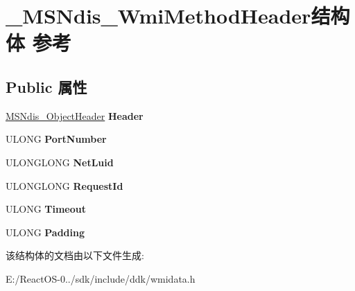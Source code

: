 \hypertarget{struct___m_s_ndis___wmi_method_header}{}\section{\+\_\+\+M\+S\+Ndis\+\_\+\+Wmi\+Method\+Header结构体 参考}
\label{struct___m_s_ndis___wmi_method_header}
\subsection*{Public 属性}
\begin{DoxyCompactItemize}
\item 
\mbox{\label{struct___m_s_ndis___wmi_method_header_a9c15f4df580f8052359808d82b1f9002}} 
\hyperlink{struct___m_s_ndis___object_header}{M\+S\+Ndis\+\_\+\+Object\+Header} {\bfseries Header}
\item 
\mbox{\label{struct___m_s_ndis___wmi_method_header_a7d6050be4527b8d428dece29eab8bbba}} 
U\+L\+O\+NG {\bfseries Port\+Number}
\item 
\mbox{\label{struct___m_s_ndis___wmi_method_header_ab00e6a5495243106fbeccb43ecac2ac0}} 
U\+L\+O\+N\+G\+L\+O\+NG {\bfseries Net\+Luid}
\item 
\mbox{\label{struct___m_s_ndis___wmi_method_header_ab333af3a91cf022616637e0a674f14b3}} 
U\+L\+O\+N\+G\+L\+O\+NG {\bfseries Request\+Id}
\item 
\mbox{\label{struct___m_s_ndis___wmi_method_header_af840bca6fff00dc2a21ce9ae7ee697db}} 
U\+L\+O\+NG {\bfseries Timeout}
\item 
\mbox{\label{struct___m_s_ndis___wmi_method_header_a467a9be6e013ece3a0b6d100e34aa03a}} 
U\+L\+O\+NG {\bfseries Padding}
\end{DoxyCompactItemize}


该结构体的文档由以下文件生成\+:\begin{DoxyCompactItemize}
\item 
E\+:/\+React\+O\+S-\/0../sdk/include/ddk/wmidata.\+h\end{DoxyCompactItemize}
